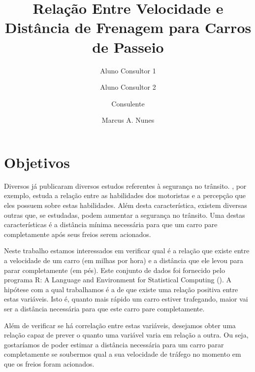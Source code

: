 \documentclass[a4paper,12pt,twoside,printwatermark=true]{modeloLEA}
\title{Relação Entre Velocidade e Distância de Frenagem para Carros de Passeio}
\author[a,b]{Aluno Consultor 1}
\author[a,b]{Aluno Consultor 2}
\author[c,d]{Consulente}
\author[a,e]{Marcus A. Nunes}
\affil[a]{Departamento de Estatística - UFRN}
\affil[b]{Consultor}
\affil[c]{Outro Departamento - UFRN}
\affil[d]{Consulente}
\affil[e]{Orientação}
\numberwithin{equation}{section}
\numberwithin{figure}{section}
\numberwithin{table}{section}
\begin{document}
\verticaladjustment{-2pt}

\maketitle
\thispagestyle{firststyle}



\hypertarget{objetivos}{%
\section{Objetivos}\label{objetivos}}

Diversos já publicaram diversos estudos referentes à segurança no
trânsito. \cite{McKenna1991}, por exemplo, estuda a relação entre as
habilidades dos motoristas e a percepção que eles possuem sobre estas
habilidades. Além desta característica, existem diversas outras que, se
estudadas, podem aumentar a segurança no trânsito. Uma destas
características é a distância mínima necessária para que um carro pare
completamente após seus freios serem acionados.

Neste trabalho estamos interessados em verificar qual é a relação que
existe entre a velocidade de um carro (em milhas por hora) e a distância
que ele levou para parar completamente (em pés). Este conjunto de dados
foi fornecido pelo programa R: A Language and Environment for
Statistical Computing (\cite{R2017}). A hipótese com a qual trabalhamos
é a de que existe uma relação positiva entre estas variáveis. Isto é,
quanto mais rápido um carro estiver trafegando, maior vai ser a
distância necessária para que este carro pare completamente.

Além de verificar se há correlação entre estas variáveis, desejamos
obter uma relação capaz de prever o quanto uma variável varia em relação
a outra. Ou seja, gostaríamos de poder estimar a distância necessária
para um carro parar completamente se soubermos qual a sua velocidade de
tráfego no momento em que os freios foram acionados.
\end{document}

